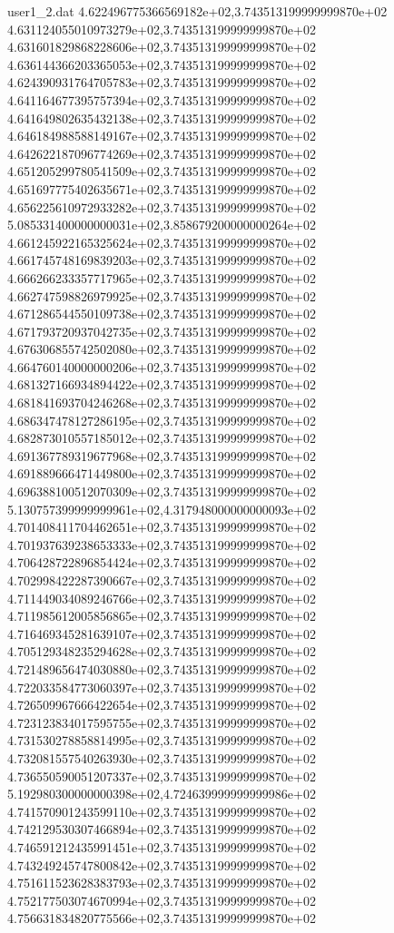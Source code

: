 \begin{filecontents}{user1_2.dat}
4.622496775366569182e+02,3.743513199999999870e+02
4.631124055010973279e+02,3.743513199999999870e+02
4.631601829868228606e+02,3.743513199999999870e+02
4.636144366203365053e+02,3.743513199999999870e+02
4.624390931764705783e+02,3.743513199999999870e+02
4.641164677395757394e+02,3.743513199999999870e+02
4.641649802635432138e+02,3.743513199999999870e+02
4.646184988588149167e+02,3.743513199999999870e+02
4.642622187096774269e+02,3.743513199999999870e+02
4.651205299780541509e+02,3.743513199999999870e+02
4.651697775402635671e+02,3.743513199999999870e+02
4.656225610972933282e+02,3.743513199999999870e+02
5.085331400000000031e+02,3.858679200000000264e+02
4.661245922165325624e+02,3.743513199999999870e+02
4.661745748169839203e+02,3.743513199999999870e+02
4.666266233357717965e+02,3.743513199999999870e+02
4.662747598826979925e+02,3.743513199999999870e+02
4.671286544550109738e+02,3.743513199999999870e+02
4.671793720937042735e+02,3.743513199999999870e+02
4.676306855742502080e+02,3.743513199999999870e+02
4.664760140000000206e+02,3.743513199999999870e+02
4.681327166934894422e+02,3.743513199999999870e+02
4.681841693704246268e+02,3.743513199999999870e+02
4.686347478127286195e+02,3.743513199999999870e+02
4.682873010557185012e+02,3.743513199999999870e+02
4.691367789319677968e+02,3.743513199999999870e+02
4.691889666471449800e+02,3.743513199999999870e+02
4.696388100512070309e+02,3.743513199999999870e+02
5.130757399999999961e+02,4.317948000000000093e+02
4.701408411704462651e+02,3.743513199999999870e+02
4.701937639238653333e+02,3.743513199999999870e+02
4.706428722896854424e+02,3.743513199999999870e+02
4.702998422287390667e+02,3.743513199999999870e+02
4.711449034089246766e+02,3.743513199999999870e+02
4.711985612005856865e+02,3.743513199999999870e+02
4.716469345281639107e+02,3.743513199999999870e+02
4.705129348235294628e+02,3.743513199999999870e+02
4.721489656474030880e+02,3.743513199999999870e+02
4.722033584773060397e+02,3.743513199999999870e+02
4.726509967666422654e+02,3.743513199999999870e+02
4.723123834017595755e+02,3.743513199999999870e+02
4.731530278858814995e+02,3.743513199999999870e+02
4.732081557540263930e+02,3.743513199999999870e+02
4.736550590051207337e+02,3.743513199999999870e+02
5.192980300000000398e+02,4.724639999999999986e+02
4.741570901243599110e+02,3.743513199999999870e+02
4.742129530307466894e+02,3.743513199999999870e+02
4.746591212435991451e+02,3.743513199999999870e+02
4.743249245747800842e+02,3.743513199999999870e+02
4.751611523628383793e+02,3.743513199999999870e+02
4.752177503074670994e+02,3.743513199999999870e+02
4.756631834820775566e+02,3.743513199999999870e+02

\end{filecontents}
